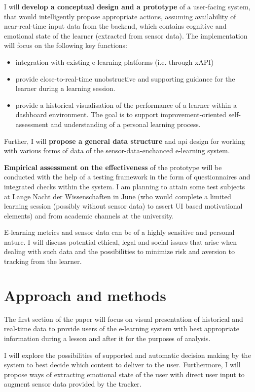 I will \textbf{develop a conceptual design and a prototype} of a user-facing system, that would intelligently propose appropriate actions, assuming availability of near-real-time input data from the backend, which contains cognitive and emotional state of the learner (extracted from sensor data). 
The implementation will focus on the following key functions:
\begin{itemize}
	\item integration with existing e-learning platforms (i.e. through xAPI)
	\item provide close-to-real-time unobstructive and supporting guidance for the learner during a learning session.
	\item provide a historical visualisation of the performance of a learner within a dashboard environment. The goal is to support improvement-oriented self-assessment and understanding of a personal learning process.
\end{itemize}

Further, I will \textbf{propose a general data structure} and api design for working with various forms of data of the sensor-data-enchanced e-learning system.

\textbf{Empirical assessment on the effectiveness} of the prototype will be conducted with the help of a testing framework in the form of questionnaires and integrated checks within the system. I am planning to attain some test subjects at Lange Nacht der Wissenschaften in June (who would complete a limited learning session (possibly without sensor data) to assert UI based motivational elements) and from academic channels at the university.

E-learning metrics and sensor data can be of a highly sensitive and personal nature.
I will discuss potential ethical, legal and social issues that arise when dealing with such data and the possibilities to minimize risk and aversion to tracking from the learner.

\section{Approach and methods}

The first section of the paper will focus on visual presentation of historical and real-time data to provide users of the e-learning system with best appropriate information during a lesson and after it for the purposes of analysis.

I will explore the possibilities of supported and automatic decision making by the system to best decide which content to deliver to the user. Furthermore, I will propose ways of extracting emotional state of the user with direct user input to augment sensor data provided by the tracker.

